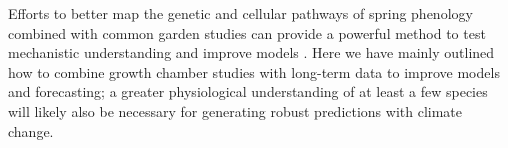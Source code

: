 \documentclass{article}
\begin{document}
\par Efforts to better map the genetic and cellular pathways of spring phenology combined with common garden studies can provide a powerful method to test mechanistic understanding and improve models \citep[e.g.,][]{Burghardt2015,fournier2016}. Here we have mainly outlined how to combine growth chamber studies with long-term data to improve models and forecasting; a greater physiological understanding of at least a few species will likely also be necessary for generating robust predictions with climate change.





\end{document}
